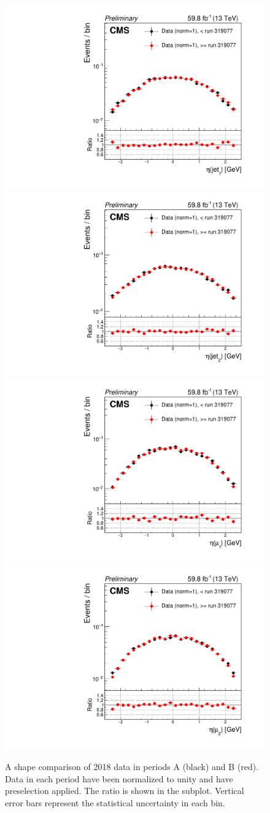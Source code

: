 \begin{figure}[H]
    \centering
    {\includegraphics[width=.49\textwidth]{Images/Analysis/Results_HEMFailureStudyPlots_Data_BeforeAfterRun319077/BasicLQ_uujj_Eta_jet1_standard.pdf}}
    {\includegraphics[width=.49\textwidth]{Images/Analysis/Results_HEMFailureStudyPlots_Data_BeforeAfterRun319077/BasicLQ_uujj_Eta_jet2_standard.pdf}}
    {\includegraphics[width=.49\textwidth]{Images/Analysis/Results_HEMFailureStudyPlots_Data_BeforeAfterRun319077/BasicLQ_uujj_Eta_muon1_standard.pdf}}
    {\includegraphics[width=.49\textwidth]{Images/Analysis/Results_HEMFailureStudyPlots_Data_BeforeAfterRun319077/BasicLQ_uujj_Eta_muon2_standard.pdf}}
    \caption{A shape comparison of 2018 data in periods A (black) and B (red). Data in each period have been normalized to unity and have preselection applied. The ratio \RatioDataAB is shown in the subplot. Vertical error bars represent the statistical uncertainty in each bin.}
    \label{figapp:hemjetmuoneta}
\end{figure}

